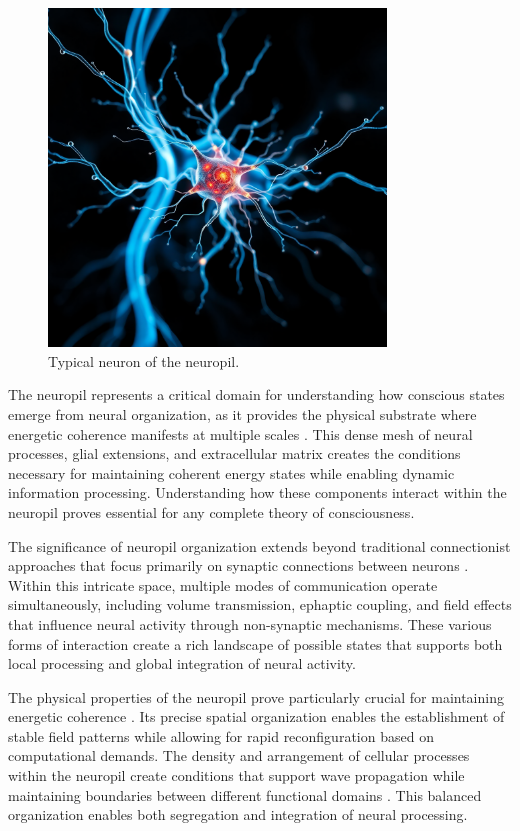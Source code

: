 \begin{refsection}
\begin{figure}[h]
    \centering
    \includegraphics[width=0.8\textwidth]{images/neuropil2.png}

    \caption{Typical neuron of the neuropil.}
\end{figure}

The neuropil represents a critical domain for understanding how conscious states emerge from neural organization, as it provides the physical substrate where energetic coherence manifests at multiple scales \cite{Ventura1999}. This dense mesh of neural processes, glial extensions, and extracellular matrix creates the conditions necessary for maintaining coherent energy states while enabling dynamic information processing. Understanding how these components interact within the neuropil proves essential for any complete theory of consciousness.

The significance of neuropil organization extends beyond traditional connectionist approaches that focus primarily on synaptic connections between neurons \cite{Kasthuri2015}. Within this intricate space, multiple modes of communication operate simultaneously, including volume transmission, ephaptic coupling, and field effects that influence neural activity through non-synaptic mechanisms. These various forms of interaction create a rich landscape of possible states that supports both local processing and global integration of neural activity.

The physical properties of the neuropil prove particularly crucial for maintaining energetic coherence \cite{Korogod2015}. Its precise spatial organization enables the establishment of stable field patterns while allowing for rapid reconfiguration based on computational demands. The density and arrangement of cellular processes within the neuropil create conditions that support wave propagation while maintaining boundaries between different functional domains \cite{Arbib1998}. This balanced organization enables both segregation and integration of neural processing.


\end{refsection}
